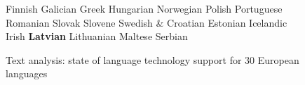 \begin{figure}[t]
\begin{tabular}
Finnish \newline 
Galician \newline 
Greek \newline 
 Hungarian \newline 
Norwegian \newline 
Polish \newline 
Portuguese \newline 
Romanian \newline 
Slovak \newline 
Slovene \newline 
Swedish\newline
& \vspace*{0.5mm}
Croatian \newline 
 Estonian \newline 
Icelandic \newline 
Irish \newline 
\textbf{Latvian} \newline 
Lithuanian \newline 
Maltese \newline 
 Serbian\\
\end{tabular}
\caption{Text analysis: state of language technology support for 30 European languages}
 \label{fig:speech_cluster_en}
\end{figure}
